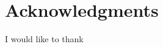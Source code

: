 \documentclass[aps,prb,twocolumn,superscriptaddress]{revtex4-1}
\begin{document}




\section*{Acknowledgments}
I would like to thank   %



\setlength{\parindent}{0cm}



\end{document}

